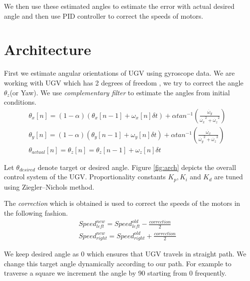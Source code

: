 \documentclass[conference]{IEEEtran}
\begin{document}
We then use these estimated angles to estimate the error with actual desired angle and then use PID controller to correct the speeds of motors.

\section{Architecture}
First we estimate angular orientations of UGV using gyroscope data. We are working with UGV which has 2 degrees of freedom , we try to correct the angle $\theta _z$(or Yaw). We use \textit{complementary filter} to estimate the angles from initial conditions.
\begin{gather}
	\theta _x[n] = (1-\alpha)(\theta _x[n-1] + \omega _x [n] \delta t) + \alpha tan^{-1}\left(\frac{\dot{\omega _y}}{\dot{\omega _x} ^2 + \dot{\omega _z} ^2}\right)\\
	\theta _y[n] = (1-\alpha)(\theta _y[n-1] + \omega _y [n] \delta t) + \alpha tan^{-1}\left(\frac{\dot{\omega _x}}{\dot{\omega _y} ^2 + \dot{\omega _z} ^2}\right)\\
	\theta _{actual}[n] = \theta _z[n] = \theta _z[n-1] + \omega _z [n] \delta t
\end{gather}

Let $\theta _{desired}$ denote target or desired angle. Figure \ref{fig:arch} depicts the overall control system of the UGV. Proportionality constants $K_p, K_i$ and $K_d$ are tuned using Ziegler–Nichols method.

The \textit{correction} which is obtained is used to correct the speeds of the motors in the following fashion.
\begin{gather*}
Speed_{left}^{new} = Speed_{left}^{old} - \frac{correction}{2}\\
Speed_{right}^{new} = Speed_{right}^{old} + \frac{correction}{2}
\end{gather*}

We keep desired angle as 0 which ensures that UGV travels in straight path. We change this target angle dynamically according to our path. For example to traverse a square we increment the angle by 90 starting from 0 frequently.
\end{document}
